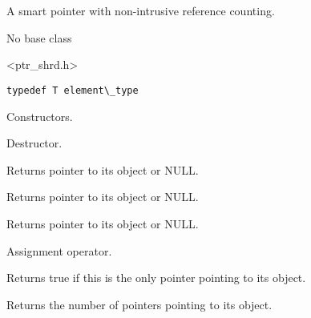 \section{}\label{wxsharedptr}

A smart pointer with non-intrusive reference counting.


No base class


<ptr\_shrd.h>


{\small \begin{verbatim}
typedef T element\_type
\end{verbatim}}



\label{wxsharedptrwxsharedptr}



Constructors.

\label{wxsharedptrdtor}


Destructor.

\label{wxsharedptrget}


Returns pointer to its object or NULL.

\label{wxsharedptroperatorptrt}


Returns pointer to its object or NULL.

\label{wxsharedptroperatorderef}


Returns pointer to its object or NULL.

\label{wxsharedptroperatorassign}


Assignment operator.

\label{wxsharedptrunique}


Returns true if this is the only pointer pointing to its object.

\label{wxsharedptruse\_count}


Returns the number of pointers pointing to its object.

